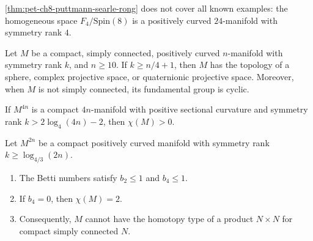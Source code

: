 \begin{remark}
  \label{rem:pet-ch8-f4-spin8-exception}

  \cref{thm:pet-ch8-puttmann-searle-rong} does not cover all known examples:
  the homogeneous space $F_4/\mathrm{Spin}(8)$ is a positively curved
  $24$-manifold with symmetry rank $4$.
\end{remark}

\begin{theorem}
  \label{thm:pet-ch8-wilking-symmetry-rank-classification}

  Let $M$ be a compact, simply connected, positively curved $n$-manifold with
  symmetry rank $k$, and $n\ge10$. If $k\ge n/4+1$, then $M$ has the topology
  of a sphere, complex projective space, or quaternionic projective space.
  Moreover, when $M$ is not simply connected, its fundamental group is cyclic.
\end{theorem}

\begin{theorem}
  \label{thm:pet-ch8-kennard-2013-euler-characteristic}

  If $M^{4n}$ is a compact $4n$-manifold with positive sectional curvature and
  symmetry rank $k>2\log_4(4n)-2$, then $\chi(M)>0$.
\end{theorem}

\begin{theorem}
  \label{thm:pet-ch8-kennard-amann-betti-numbers}

  Let $M^{2n}$ be a compact positively curved manifold with symmetry rank
  $k\ge\log_{4/3}(2n)$.
  \begin{enumerate}
    \item The Betti numbers satisfy $b_2\le1$ and $b_4\le1$.
    \item If $b_4=0$, then $\chi(M)=2$.
    \item Consequently, $M$ cannot have the homotopy type of a product
      $N\times N$ for compact simply connected $N$.
  \end{enumerate}
\end{theorem}

